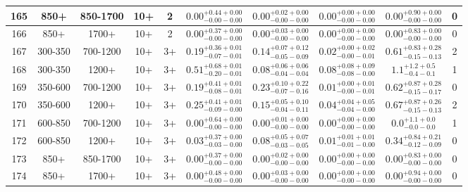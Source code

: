\documentclass[11pt, oneside]{article}
\begin{document}
\begin{table}
{\begin{tabular}{ |c|c|c|c|c||c|c|c||c|c| }
165 & 850+ & 850-1700 & 10+ & 2 & $0.00^{+0.44+0.00}_{-0.00-0.00}$ & $0.00^{+0.02+0.00}_{-0.00-0.00}$ & $0.00^{+0.00+0.00}_{-0.00-0.00}$ & $0.00^{+0.90+0.00}_{-0.00-0.00}$ & 0 \\ \hline
166 & 850+ & 1700+ & 10+ & 2 & $0.00^{+0.37+0.00}_{-0.00-0.00}$ & $0.00^{+0.03+0.00}_{-0.00-0.00}$ & $0.00^{+0.00+0.00}_{-0.00-0.00}$ & $0.00^{+0.83+0.00}_{-0.00-0.00}$ & 0 \\ \hline
167 & 300-350 & 700-1200 & 10+ & 3+ & $0.19^{+0.36+0.01}_{-0.07-0.01}$ & $0.14^{+0.07+0.12}_{-0.05-0.09}$ & $0.02^{+0.00+0.02}_{-0.00-0.01}$ & $0.61^{+0.83+0.28}_{-0.15-0.13}$ & 2 \\ \hline
168 & 300-350 & 1200+ & 10+ & 3+ & $0.51^{+0.68+0.01}_{-0.20-0.01}$ & $0.08^{+0.06+0.06}_{-0.04-0.04}$ & $0.08^{+0.08+0.09}_{-0.08-0.00}$ & $1.1^{+1.2+0.5}_{-0.4-0.1}$ & 1 \\ \hline
169 & 350-600 & 700-1200 & 10+ & 3+ & $0.19^{+0.41+0.01}_{-0.08-0.01}$ & $0.23^{+0.10+0.22}_{-0.07-0.16}$ & $0.01^{+0.00+0.01}_{-0.00-0.01}$ & $0.62^{+0.87+0.28}_{-0.15-0.17}$ & 0 \\ \hline
170 & 350-600 & 1200+ & 10+ & 3+ & $0.25^{+0.41+0.01}_{-0.09-0.00}$ & $0.15^{+0.05+0.10}_{-0.04-0.11}$ & $0.04^{+0.04+0.05}_{-0.04-0.00}$ & $0.67^{+0.87+0.26}_{-0.15-0.13}$ & 2 \\ \hline
171 & 600-850 & 700-1200 & 10+ & 3+ & $0.00^{+0.64+0.00}_{-0.00-0.00}$ & $0.00^{+0.01+0.00}_{-0.00-0.00}$ & $0.00^{+0.00+0.00}_{-0.00-0.00}$ & $0.0^{+1.1+0.0}_{-0.0-0.0}$ & 1 \\ \hline
172 & 600-850 & 1200+ & 10+ & 3+ & $0.03^{+0.37+0.00}_{-0.03-0.00}$ & $0.08^{+0.05+0.07}_{-0.03-0.05}$ & $0.01^{+0.01+0.01}_{-0.01-0.00}$ & $0.34^{+0.84+0.21}_{-0.12-0.09}$ & 0 \\ \hline
173 & 850+ & 850-1700 & 10+ & 3+ & $0.00^{+0.37+0.00}_{-0.00-0.00}$ & $0.00^{+0.02+0.00}_{-0.00-0.00}$ & $0.00^{+0.00+0.00}_{-0.00-0.00}$ & $0.00^{+0.83+0.00}_{-0.00-0.00}$ & 0 \\ \hline
174 & 850+ & 1700+ & 10+ & 3+ & $0.00^{+0.48+0.00}_{-0.00-0.00}$ & $0.00^{+0.03+0.00}_{-0.00-0.00}$ & $0.00^{+0.00+0.00}_{-0.00-0.00}$ & $0.00^{+0.94+0.00}_{-0.00-0.00}$ & 0 \\ \hline
\end{tabular}}
\end{table}
\end{document}
